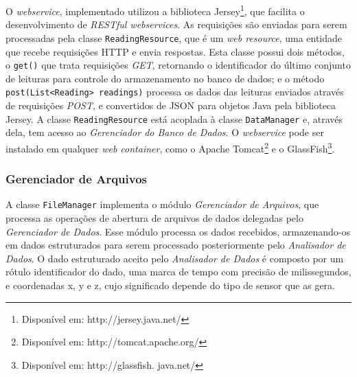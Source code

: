O \emph{webservice}, implementado utilizou a biblioteca Jersey\footnote{Disponível em: http://jersey.java.net/}, que facilita o desenvolvimento de \textit{RESTful webservices}. As requisições são enviadas para serem processadas pela classe \texttt{ReadingResource}, que é um \textit{web resource}, uma entidade que recebe requisições HTTP e envia respostas. Esta classe possui dois métodos, o \texttt{get()} que trata requisições \emph{GET}, retornando o identificador do último conjunto de leituras para controle do armazenamento no banco de dados; e o método \texttt{post(List<Reading> readings)} processa os dados das leituras enviados através de requisições \emph{POST}, e convertidos de JSON para objetos Java pela biblioteca Jersey. A classe \texttt{ReadingResource} está acoplada à classe \texttt{DataManager} e, através dela, tem acesso ao \emph{Gerenciador do Banco de Dados}. O \emph{webservice} pode ser instalado em qualquer \textit{web container}, como o Apache Tomcat\footnote{Disponível em: http://tomcat.apache.org/} e o GlassFish\footnote{Disponível em: http://glassfish.
java.net/}.

\subsubsection{Gerenciador de Arquivos}

A classe \texttt{FileManager} implementa o módulo \emph{Gerenciador de Arquivos}, que processa as operações de abertura de arquivos de dados delegadas pelo \emph{Gerenciador de Dados}. Esse módulo processa os dados recebidos, armazenando-os em dados estruturados para serem processado posteriormente pelo \emph{Analisador de Dados}. O dado estruturado aceito pelo \emph{Analisador de Dados} é composto por um rótulo identificador do dado, uma marca de tempo com precisão de milissegundos, e coordenadas x, y e z, cujo significado depende do tipo de sensor que as gera.

